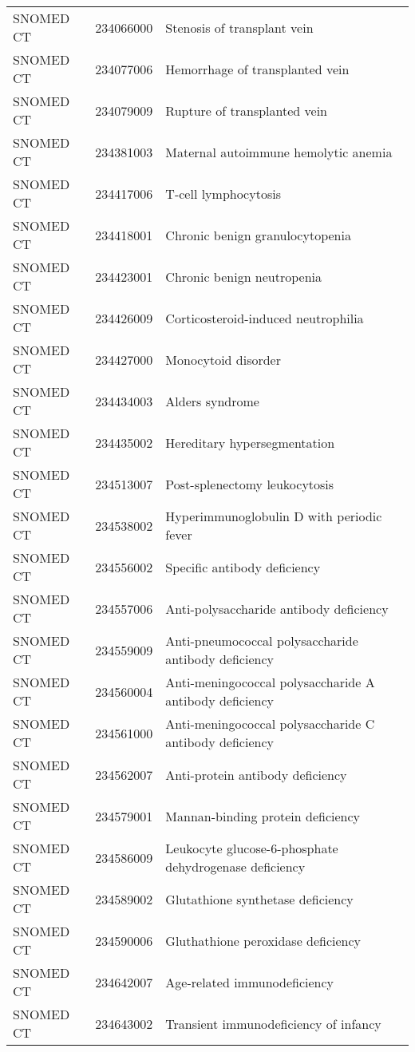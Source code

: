 \begin{longtable}{p{}p{}p{}}
  SNOMED CT & 234066000 & Stenosis of transplant vein \\ 
  SNOMED CT & 234077006 & Hemorrhage of transplanted vein \\ 
  SNOMED CT & 234079009 & Rupture of transplanted vein \\ 
  SNOMED CT & 234381003 & Maternal autoimmune hemolytic anemia \\ 
  SNOMED CT & 234417006 & T-cell lymphocytosis \\ 
  SNOMED CT & 234418001 & Chronic benign granulocytopenia \\ 
  SNOMED CT & 234423001 & Chronic benign neutropenia \\ 
  SNOMED CT & 234426009 & Corticosteroid-induced neutrophilia \\ 
  SNOMED CT & 234427000 & Monocytoid disorder \\ 
  SNOMED CT & 234434003 & Alders syndrome \\ 
  SNOMED CT & 234435002 & Hereditary hypersegmentation \\ 
  SNOMED CT & 234513007 & Post-splenectomy leukocytosis \\ 
  SNOMED CT & 234538002 & Hyperimmunoglobulin D with periodic fever \\ 
  SNOMED CT & 234556002 & Specific antibody deficiency \\ 
  SNOMED CT & 234557006 & Anti-polysaccharide antibody deficiency \\ 
  SNOMED CT & 234559009 & Anti-pneumococcal polysaccharide antibody deficiency \\ 
  SNOMED CT & 234560004 & Anti-meningococcal polysaccharide A antibody deficiency \\ 
  SNOMED CT & 234561000 & Anti-meningococcal polysaccharide C antibody deficiency \\ 
  SNOMED CT & 234562007 & Anti-protein antibody deficiency \\ 
  SNOMED CT & 234579001 & Mannan-binding protein deficiency \\ 
  SNOMED CT & 234586009 & Leukocyte glucose-6-phosphate dehydrogenase deficiency \\ 
  SNOMED CT & 234589002 & Glutathione synthetase deficiency \\ 
  SNOMED CT & 234590006 & Gluthathione peroxidase deficiency \\ 
  SNOMED CT & 234642007 & Age-related immunodeficiency \\ 
  SNOMED CT & 234643002 & Transient immunodeficiency of infancy \\ 

\end{longtable}

